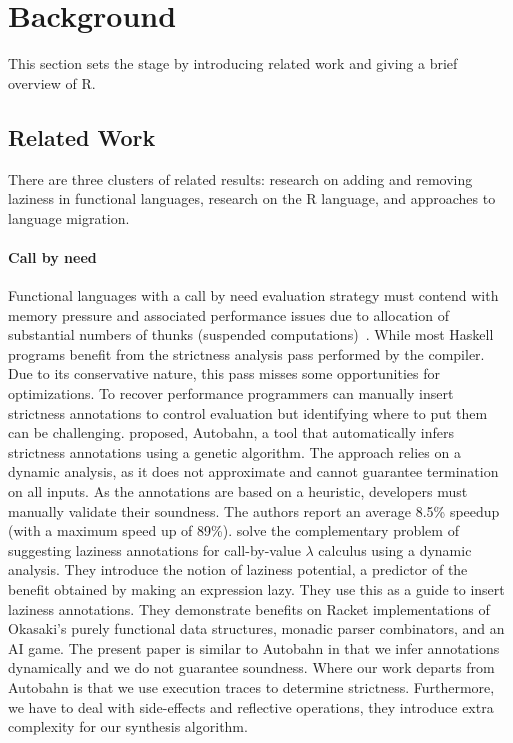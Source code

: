 \documentclass[review,nonacm,screen,acmsmall,anonymous=true]{acmart}
\begin{document}
\section{Background}

This section sets the stage by introducing related work and giving a brief
overview of R.

\subsection{Related Work}

There are three clusters of related results: research on adding and removing
laziness in functional languages, research on the R language, and approaches to
language migration.

\paragraph{Call by need}  Functional languages with
a call by need evaluation strategy must contend with memory pressure and
associated performance issues due to allocation of substantial numbers of thunks
(suspended computations)~\cite{transformopt,stricteffective,opteval}. While most
Haskell programs benefit from the strictness analysis pass performed by the
compiler. Due to its conservative nature, this pass misses some opportunities
for optimizations. To recover performance programmers can manually insert
strictness annotations to control evaluation but identifying where to put them
can be challenging. \citet{autobahn} proposed, Autobahn, a tool that
automatically infers strictness annotations using a genetic algorithm. The
approach relies on a dynamic analysis, as it does not approximate and cannot
guarantee termination on all inputs. As the annotations are based on a
heuristic, developers must manually validate their soundness. The authors report
an average 8.5\% speedup (with a maximum speed up of 89\%). \citet{lazyprof}
solve the complementary problem of suggesting laziness annotations for
call-by-value $\lambda$ calculus using a dynamic analysis. They introduce the
notion of laziness potential, a predictor of the benefit obtained by making an
expression lazy. They use this as a guide to insert laziness annotations. They
demonstrate benefits on Racket implementations of Okasaki's purely functional
data structures, monadic parser combinators, and an AI game. The present paper
is similar to Autobahn in that we infer annotations dynamically and we do not
guarantee soundness. Where our work departs from Autobahn is that we use
execution traces to determine strictness. Furthermore, we have to deal with
side-effects and reflective operations, they introduce extra complexity for our
synthesis algorithm.
\end{document}
